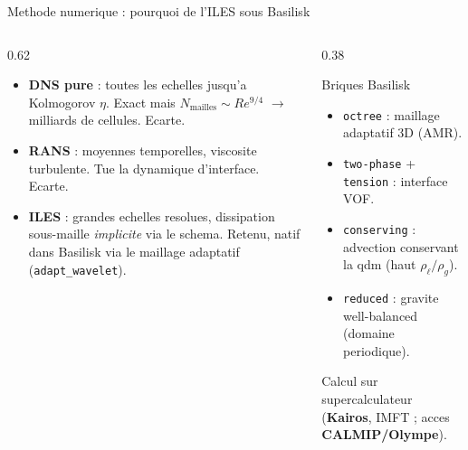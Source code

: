 \documentclass[11pt,aspectratio=169]{beamer}
\begin{document}
\begin{frame}{Methode numerique : pourquoi de l'ILES sous Basilisk}
  \begin{columns}[T]
    \begin{column}{0.62\textwidth}
      \begin{itemize}
        \item \textbf{DNS pure} : toutes les echelles jusqu'a Kolmogorov $\eta$.
              Exact mais $N_{\text{mailles}}\sim Re^{9/4}$ $\rightarrow$ milliards
              de cellules. \textcolor{warnred}{Ecarte.}
        \item \textbf{RANS} : moyennes temporelles, viscosite turbulente.
              Tue la dynamique d'interface. \textcolor{warnred}{Ecarte.}
        \item \textbf{ILES} : grandes echelles resolues, dissipation sous-maille
              \emph{implicite} via le schema. \textcolor{okgreen}{Retenu}, natif
              dans Basilisk via le maillage adaptatif (\texttt{adapt\_wavelet}).
      \end{itemize}
    \end{column}
    \begin{column}{0.38\textwidth}
      \footnotesize
      \begin{block}{Briques Basilisk}
        \begin{itemize}
          \item \texttt{octree} : maillage adaptatif 3D (AMR).
          \item \texttt{two-phase} + \texttt{tension} : interface VOF.
          \item \texttt{conserving} : advection conservant la qdm (haut $\rho_\ell/\rho_g$).
          \item \texttt{reduced} : gravite well-balanced (domaine periodique).
        \end{itemize}
      \end{block}
      Calcul sur supercalculateur (\textbf{Kairos}, IMFT ; acces \textbf{CALMIP/Olympe}).
    \end{column}
  \end{columns}
\end{frame}

\end{document}
